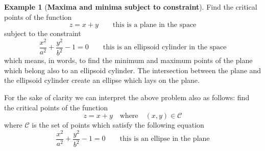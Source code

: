 \documentclass[11pt,a4paper,oneside]{book}
\numberwithin{equation}{section}
\theoremstyle{it}
\theoremstyle{definition}
\newtheorem{example}{Example}[chapter]
\begin{document}
\begin{example}[\textbf{Maxima and minima subject to constraint}]
	Find the critical points of the function 
	\begin{equation}
		z=x+y\qquad\text{this is a plane in the space}
	\end{equation}
	subject to the constraint 
	\begin{equation}
		\frac{x^2}{a^2}+\frac{y^2}{b^2}-1=0 \qquad\text{this is an ellipsoid cylinder in the space}
	\end{equation}
	which means, in words, to find the minimum and maximum points of the plane 
	which belong also to an ellipsoid cylinder. The intersection between the plane 
	and the ellipsoid cylinder create an ellipse which lays on the plane.
	
	For the sake of clarity we can interpret the above problem also as follows: find the critical points of the function 
	\begin{equation}
		z=x+y\quad\text{where}\quad (x,y)\in\mathscr{C}
	\end{equation}
	where $\mathscr{C}$ is the set of points which satisfy the following equation
	\begin{equation}
		\frac{x^2}{a^2}+\frac{y^2}{b^2}-1=0 \qquad\text{this is an ellipse in the plane}
	\end{equation}
	

\end{example}
\end{document}

